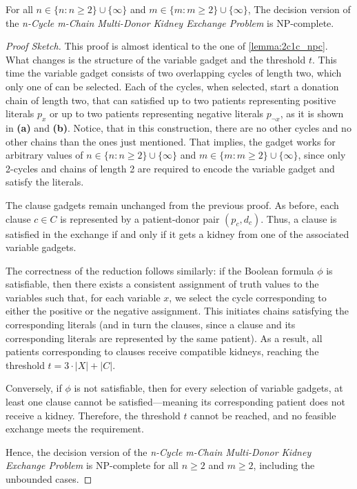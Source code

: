 \begin{lemma}
\label{lemma:ncmc_npc}
For all $n \in \{n : n \ge 2\} \cup \{\infty\}$ and $m \in \{m:m \ge 2\} \cup \{\infty\}$, The decision version of the \textit{n-Cycle m-Chain Multi-Donor Kidney Exchange Problem} is NP-complete.

\begin{proof}[Proof Sketch]
This proof is almost identical to the one of \autoref{lemma:2c1c_npc}. What changes is the structure of the variable gadget and the threshold $t$. This time the variable gadget consists of two overlapping cycles of length two, which only one of can be selected. Each of the cycles, when selected, start a donation chain of length two, that can satisfied up to two patients representing positive literals $p_x$ or up to two patients representing negative literals $p_{\neg{x}}$, as it is shown in \textbf{(a)} and \textbf{(b)}. Notice, that in this construction, there are no other cycles and no other chains than the ones just mentioned. That implies, the gadget works for arbitrary values of $n \in \{n : n \ge 2\} \cup \{\infty\}$ and $m \in \{m : m \ge 2\} \cup \{\infty\}$, since only 2-cycles and chains of length 2 are required to encode the variable gadget and satisfy the literals.

The clause gadgets remain unchanged from the previous proof. As before, each clause $c \in C$ is represented by a patient-donor pair $(p_c, d_c)$. Thus, a clause is satisfied in the exchange if and only if it gets a  kidney from one of the associated variable gadgets.

The correctness of the reduction follows similarly: if the Boolean formula $\phi$ is satisfiable, then there exists a consistent assignment of truth values to the variables such that, for each variable $x$, we select the cycle corresponding to either the positive or the negative assignment. This initiates chains satisfying the corresponding literals (and in turn the clauses, since a clause and its corresponding literals are represented by the same patient). As a result, all patients corresponding to clauses receive compatible kidneys, reaching the threshold $t = 3 \cdot |X| + |C|$.

Conversely, if $\phi$ is not satisfiable, then for every selection of variable gadgets, at least one clause cannot be satisfied—meaning its corresponding patient does not receive a kidney. Therefore, the threshold $t$ cannot be reached, and no feasible exchange meets the requirement.

Hence, the decision version of the \textit{n-Cycle m-Chain Multi-Donor Kidney Exchange Problem} is NP-complete for all $n \ge 2$ and $m \ge 2$, including the unbounded cases.


\end{proof}
\end{lemma}
